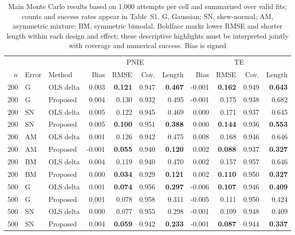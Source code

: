 \begin{table}[t]
\centering
\caption{Main Monte Carlo results based on 1,000 attempts per cell and summarized over valid fits; counts and success rates appear in Table~S1. G, Gaussian; SN, skew-normal; AM, asymmetric mixture; BM, symmetric bimodal. Boldface marks lower RMSE and shorter length within each design and effect; these descriptive highlights must be interpreted jointly with coverage and numerical success. Bias is signed}
\label{tab:main_simulation}
\footnotesize
\setlength{\tabcolsep}{3.5pt}
\begin{tabular}{rllrrrrrrrr}
\toprule
& & & \multicolumn{4}{c}{PNIE} & \multicolumn{4}{c}{TE} \\
\cmidrule(lr){4-7}\cmidrule(lr){8-11}
$n$ & Error & Method & Bias & RMSE & Cov. & Length & Bias & RMSE & Cov. & Length \\
\midrule
200 & G & OLS delta & 0.003 & \textbf{0.121} & 0.947 & \textbf{0.467} & -0.001 & \textbf{0.162} & 0.949 & \textbf{0.643} \\
200 & G & Proposed & 0.004 & 0.130 & 0.932 & 0.495 & -0.001 & 0.175 & 0.938 & 0.682 \\
\midrule
200 & SN & OLS delta & 0.005 & 0.122 & 0.945 & 0.469 & 0.000 & 0.171 & 0.937 & 0.645 \\
200 & SN & Proposed & 0.005 & \textbf{0.100} & 0.951 & \textbf{0.388} & 0.000 & \textbf{0.144} & 0.936 & \textbf{0.553} \\
\midrule
200 & AM & OLS delta & 0.001 & 0.126 & 0.942 & 0.475 & 0.008 & 0.168 & 0.946 & 0.646 \\
200 & AM & Proposed & -0.001 & \textbf{0.055} & 0.940 & \textbf{0.120} & 0.002 & \textbf{0.088} & 0.937 & \textbf{0.327} \\
\midrule
200 & BM & OLS delta & 0.004 & 0.119 & 0.940 & 0.470 & 0.002 & 0.157 & 0.957 & 0.646 \\
200 & BM & Proposed & 0.000 & \textbf{0.034} & 0.929 & \textbf{0.121} & 0.002 & \textbf{0.110} & 0.950 & \textbf{0.327} \\
\midrule
500 & G & OLS delta & 0.001 & \textbf{0.074} & 0.956 & \textbf{0.297} & -0.006 & \textbf{0.107} & 0.946 & \textbf{0.409} \\
500 & G & Proposed & 0.001 & 0.078 & 0.958 & 0.311 & -0.005 & 0.111 & 0.950 & 0.424 \\
\midrule
500 & SN & OLS delta & 0.000 & 0.077 & 0.955 & 0.298 & -0.001 & 0.109 & 0.948 & 0.409 \\
500 & SN & Proposed & 0.004 & \textbf{0.059} & 0.942 & \textbf{0.233} & -0.001 & \textbf{0.087} & 0.944 & \textbf{0.337} \\

\end{tabular}
\end{table}
